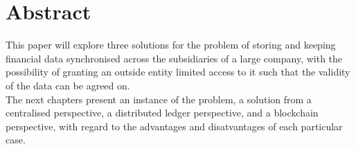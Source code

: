 \section{Abstract}
This paper will explore three solutions for the problem of storing and keeping financial data synchronised across the subsidiaries of a large company, with the possibility of granting an outside entity limited access to it such that the validity of the data can be agreed on.\\
The next chapters present an instance of the problem, a solution from a centralised perspective, a distributed ledger perspective, and a blockchain perspective, with regard to the advantages and disatvantages of each particular case.
